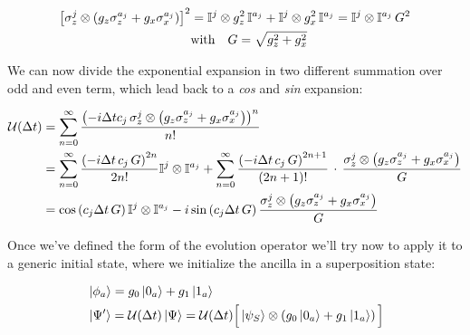 \documentclass[a4paper,12pt]{article}
\begin{document}
	\begin{align}
		{\left[\sigma_{z}^{j} \otimes \left(g_{z} \sigma_{z}^{a_j} + g_{x} \sigma_{x}^{a_j} \right)\right]}^{2} &= \mathbb{I}^{j} \otimes g_{z}^{2} \, \mathbb{I}^{a_j} + \mathbb{I}^{j} \otimes g_{x}^{2} \, \mathbb{I}^{a_j}
		= \mathbb{I}^{j} \otimes \mathbb{I}^{a_j} \, G^{2} \\ 
		& \text{with} \quad G = \sqrt{g_{z}^{2} + g_{x}^{2}} \notag
	\end{align}
	 
	 \clearpage
	 \newpage
	 
	 \begin{flushleft}
	 	 We can now divide the exponential expansion in two different summation over odd  and even term, which lead back to a \textit{cos} and \textit{sin} expansion:	
	 \end{flushleft}
		 
	 \begin{align}
	 	\mathcal{U}(\Delta t) &= \sum_{n=0}^{\infty}{\frac{\left(-i \Delta t c_{j} \, \sigma_{z}^{j} \otimes \left(g_{z} \sigma_{z}^{a_j} + g_{x} \sigma_{x}^{a_j} \right) \right)^n}{n!}} \notag \\
	 	&= \sum_{n=0}^{\infty}{\frac{\left(-i \Delta t \, c_{j} \, G \right)^{2n}}{2n!} \mathbb{I}^{j} \otimes \mathbb{I}^{a_j} } + \sum_{n=0}^{\infty}{\frac{\left(-i \Delta t \, c_{j} \, G \right)^{2n+1}}{(2n+1)!} \, \cdot \, \frac{\sigma_{z}^{j} \otimes \left(g_{z} \sigma_{z}^{a_j} + g_{x} \sigma_{x}^{a_j} \right)}{G} } \notag \\
	 	&= \cos{\left(c_{j} \Delta t \, G \right)} \, \mathbb{I}^{j} \otimes \mathbb{I}^{a_j} -i \sin{\left(c_{j} \Delta t \, G \right)} \, \frac{\sigma_{z}^{j} \otimes \left(g_{z} \sigma_{z}^{a_j} + g_{x} \sigma_{x}^{a_j} \right)}{G}
	  \end{align}
	  
	  Once we've defined the form of the evolution operator we'll try now to apply it to a generic initial state, where we initialize the ancilla in a superposition state: 
	  
	  \begin{align}
	  	& \ket{\phi_{a}} = g_{0} \ket{0_a} + g_{1}\ket{1_a} \\
	  	& \ket{\Psi'} = \mathcal{U}(\Delta t)\ket{\Psi} = \mathcal{U}(\Delta t)\Big[ \ket{\psi_S} \otimes \left(g_{0} \ket{0_a} + g_{1}\ket{1_a} \right) \Big]
	  \end{align}
	  
	  
\end{document}
